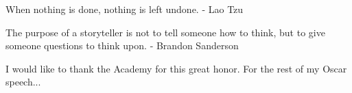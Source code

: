 \documentclass[numrefs,sort&compress,review]{nddiss2e}
\begin{document}
\tableofcontents
\listoffigures
\listoftables

\begin{preface}
  
When nothing is done, nothing is left undone. - Lao Tzu
  
The purpose of a storyteller is not to tell someone how to think, but to give someone questions to think upon. - Brandon Sanderson
  
  
\end{preface}

\begin{acknowledge}
I would like to thank the Academy for this great honor. For the rest of my Oscar speech...










\end{acknowledge}
\end{document}
